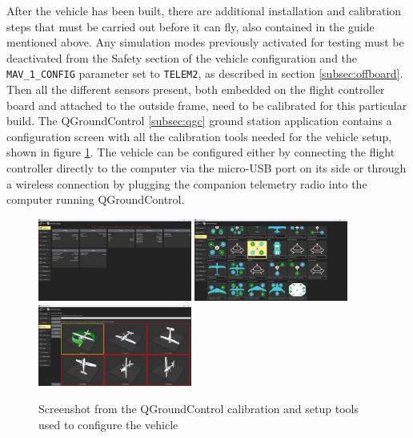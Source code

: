 After the vehicle has been built, there are additional installation and calibration steps that must be carried out before it can fly, also contained in the guide mentioned above.
Any simulation modes previously activated for testing must be deactivated from the Safety section of the vehicle configuration and the \texttt{MAV\_1\_CONFIG} parameter set to \texttt{TELEM2}, as described in section \ref{subsec:offboard}.
Then all the different sensors present, both embedded on the flight controller board and attached to the outside frame, need to be calibrated for this particular build.
The QGroundControl \ref{subsec:qgc} ground station application contains a configuration screen with all the calibration tools needed for the vehicle setup, shown in figure \ref{fig:qgc-config}.
The vehicle can be configured either by connecting the flight controller directly to the computer via the micro-USB port on its side or through a wireless connection by plugging the companion telemetry radio into the computer running QGroundControl.


\begin{figure}
  \centering
  \includegraphics[width=0.45\textwidth, keepaspectratio]{img/qgc-config-1.png}
  \includegraphics[width=0.45\textwidth, keepaspectratio]{img/qgc-config-3.png}\\
  \includegraphics[width=0.45\textwidth, keepaspectratio]{img/qgc-config-2.png}
  \caption{Screenshot from the QGroundControl calibration and setup tools used to configure the vehicle}\label{fig:qgc-config}
\end{figure}


